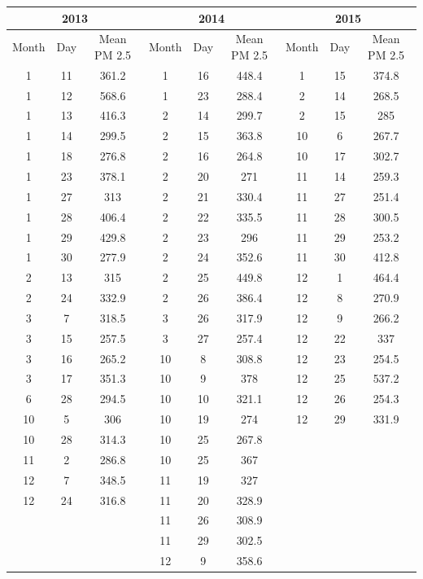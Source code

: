 \documentclass[11pt]{article} %
\begin{document}
\begin{tabular}{| ccc | ccc | ccc |}
\hline
\multicolumn{3}{|c|}{2013} & 
\multicolumn{3}{|c|}{2014} &
\multicolumn{3}{|c|}{2015} \\ \hline
Month & Day & Mean PM 2.5 & 
Month & Day & Mean PM 2.5 &
Month & Day & Mean PM 2.5 \\ \hline
1 & 11 & 361.2 &1 & 16 & 448.4 &1 & 15 & 374.8 \\
1 & 12 & 568.6 &1 & 23 & 288.4 &2 & 14 & 268.5  \\
1 & 13 & 416.3 &2 & 14 & 299.7 &2 & 15 & 285  \\
1 & 14 & 299.5 &2 & 15 & 363.8 &10 & 6 & 267.7 \\
1 & 18 & 276.8 &2 & 16 & 264.8 &10 & 17 & 302.7  \\
1 & 23 & 378.1 &2 & 20 & 271 &11 & 14 & 259.3  \\
1 & 27 & 313 &2 & 21 & 330.4 &11 & 27 & 251.4  \\
1 & 28 & 406.4 &2 & 22 & 335.5 &11 & 28 & 300.5  \\
1 & 29 & 429.8 &2 & 23 & 296 &11 & 29 & 253.2 \\
1 & 30 & 277.9 &2 & 24 & 352.6 &11 & 30 & 412.8  \\ 
2 & 13 & 315 &2 & 25 & 449.8 &12 & 1 & 464.4  \\
2 & 24 & 332.9 &2 & 26 & 386.4 &12 & 8 & 270.9   \\
3 & 7 & 318.5&3 & 26 & 317.9 &12 & 9 & 266.2  \\
3 & 15 & 257.5 &3 & 27 & 257.4 &12 & 22 & 337   \\
3 & 16 & 265.2 &10 & 8 & 308.8&12 & 23 & 254.5  \\
3 & 17 & 351.3 &10  & 9 & 378 &12 & 25 & 537.2   \\
6 & 28 & 294.5 &10 & 10 & 321.1 &12 & 26 & 254.3  \\
10 & 5 & 306 &10  & 19 & 274 &12 & 29 & 331.9  \\
10  & 28 & 314.3 &10 & 25 & 267.8 &&& \\
11 & 2 & 286.8 &10  & 25 & 367 &&& \\
12 & 7 & 348.5  &11 & 19 & 327 &&& \\
12 & 24 & 316.8 &11 & 20 & 328.9 &&& \\
&&&11 & 26 & 308.9 &&& \\
&&&11 & 29 & 302.5 &&& \\
&&&12 & 9 & 358.6 &&& \\
\hline
\end{tabular}
\end{document}
